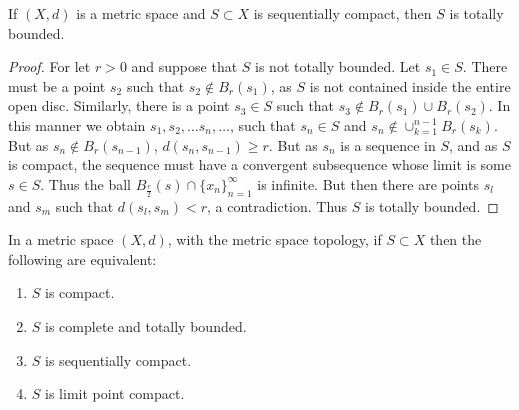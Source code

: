 \documentclass[crop=false,class=book]{standalone}
\begin{document}
\begin{theorem}
If $(X,d)$ is a metric space and $S\subset X$ is sequentially compact, then $S$ is totally bounded.
\end{theorem}
\begin{proof}
For let $r>0$ and suppose that $S$ is not totally bounded. Let $s_1\in S$. There must be a point $s_2$ such that $s_2 \notin B_{r}(s_1)$, as $S$ is not contained inside the entire open disc. Similarly, there is a point $s_3\in S$ such that $s_3 \notin B_r(s_1)\cup B_r(s_2)$. In this manner we obtain $s_1, s_2, \hdots s_n, \hdots$, such that $s_n \in S$ and $s_n \notin \cup_{k=1}^{n-1}B_r(s_k)$. But as $s_n \notin B_r(s_{n-1})$, $d(s_n, s_{n-1})\geq r$. But as $s_n$ is a sequence in $S$, and as $S$ is compact, the sequence must have a convergent subsequence whose limit is some $s\in S$. Thus the ball $B_{\frac{r}{2}}(s)\cap \{x_n\}_{n=1}^{\infty}$ is infinite. But then there are points $s_{l}$ and $s_{m}$ such that $d(s_l,s_m)<r$, a contradiction. Thus $S$ is totally bounded.
\end{proof}
\begin{theorem}
In a metric space $(X,d)$, with the metric space topology, if $S\subset X$ then the following are equivalent:
\begin{enumerate}
\item $S$ is compact.
\item $S$ is complete and totally bounded.
\item $S$ is sequentially compact.
\item $S$ is limit point compact.
\end{enumerate}
\end{theorem}
\end{document}
